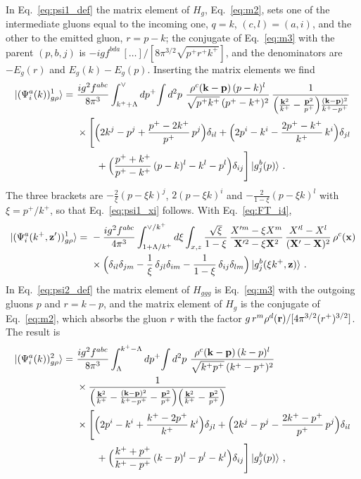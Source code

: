 In Eq.~\eqref{eq:psi1_def} the matrix element of $H_g$, Eq.~\eqref{eq:m2}, sets one of the intermediate gluons equal to the incoming one, $q=k$, $(c,l)=(a,i)$, and the other to the emitted gluon, $r=p-k$; the conjugate of Eq.~\eqref{eq:m3} with the parent $(p,b,j)$ is $-igf^{bda}\,[\dots]/[8\pi^{3/2}\sqrt{p^+r^+k^+}]$, and the denominators are $-E_g(r)$ and $E_g(k)-E_g(p)$. Inserting the matrix elements we find
\begin{align}\label{eq:psi1}
\ket{(\Psi^a_i(k))^1_{g\rho}}=\ &\frac{ig^2f^{abc}}{8\pi^3}\int_{k^++\Lambda}^{\vee}dp^+\!\int d^2p\ \frac{\rho^c(\v k-\v p)\,(p-k)^l}{\sqrt{p^+k^+}\,(p^+-k^+)^2}\,
\frac{1}{\Big(\frac{\v k^2}{k^+}-\frac{\v p^2}{p^+}\Big)\frac{(\v k-\v p)^2}{k^+-p^+}}\notag\\
&\times\Bigg[\Big(2k^j-p^j+\frac{p^+-2k^+}{p^+}\,p^j\Big)\delta_{il}+\Big(2p^i-k^i-\frac{2p^+-k^+}{k^+}\,k^i\Big)\delta_{jl}\notag\\
&\qquad+\Big(\frac{p^++k^+}{p^+-k^+}\,(p-k)^l-k^l-p^l\Big)\delta_{ij}\Bigg]\ket{g^b_j(p)}\,.
\end{align}
The three brackets are $-\frac2\xi(p-\xi k)^j$, $2(p-\xi k)^i$ and $-\frac{2}{1-\xi}(p-\xi k)^l$ with $\xi=p^+/k^+$, so that
Eq.~\eqref{eq:psi1_xi} follows. With Eq.~\eqref{eq:FT_i4},
\begin{align}\label{eq:psi1X}
\ket{(\Psi^a_i(k^+,\v z'))^1_{g\rho}}=\ &-\frac{ig^2f^{abc}}{4\pi^3}\int_{1+\Lambda/k^+}^{\vee/k^+}d\xi\int_{x,z}\frac{\sqrt\xi}{1-\xi}\,\frac{X'^m-\xi X^m}{\v X'^2-\xi\v X^2}\,\frac{X'^l-X^l}{(\v X'-\v X)^2}\,\rho^c(\v x)\notag\\
&\times\Big(\delta_{il}\delta_{jm}-\frac1\xi\,\delta_{jl}\delta_{im}-\frac{1}{1-\xi}\,\delta_{ij}\delta_{lm}\Big)\ket{g^b_j(\xi k^+,\v z)}\,.
\end{align}
In Eq.~\eqref{eq:psi2_def} the matrix element of $H_{ggg}$ is Eq.~\eqref{eq:m3} with the outgoing gluons $p$ and $r=k-p$, and the matrix element of $H_g$ is the conjugate of Eq.~\eqref{eq:m2}, which absorbs the gluon $r$ with the factor $g\,r^m\rho^d(\mathbf{r})/[4\pi^{3/2}(r^+)^{3/2}]$. The result is
\begin{align}\label{eq:psi2}
\ket{(\Psi^a_i(k))^2_{g\rho}}=\ &\frac{ig^2f^{abc}}{8\pi^3}\int_{\Lambda}^{k^+-\Lambda}dp^+\!\int d^2p\ \frac{\rho^c(\v k-\v p)\,(k-p)^l}{\sqrt{k^+p^+}\,(k^+-p^+)^2}\notag\\
&\times\frac{1}{\Big(\frac{\v k^2}{k^+}-\frac{(\v k-\v p)^2}{k^+-p^+}-\frac{\v p^2}{p^+}\Big)\Big(\frac{\v k^2}{k^+}-\frac{\v p^2}{p^+}\Big)}\notag\\
&\times\Bigg[\Big(2p^i-k^i+\frac{k^+-2p^+}{k^+}\,k^i\Big)\delta_{jl}+\Big(2k^j-p^j-\frac{2k^+-p^+}{p^+}\,p^j\Big)\delta_{il}\notag\\
&\qquad+\Big(\frac{k^++p^+}{k^+-p^+}\,(k-p)^l-p^l-k^l\Big)\delta_{ij}\Bigg]\ket{g^b_j(p)}\,,
\end{align}
